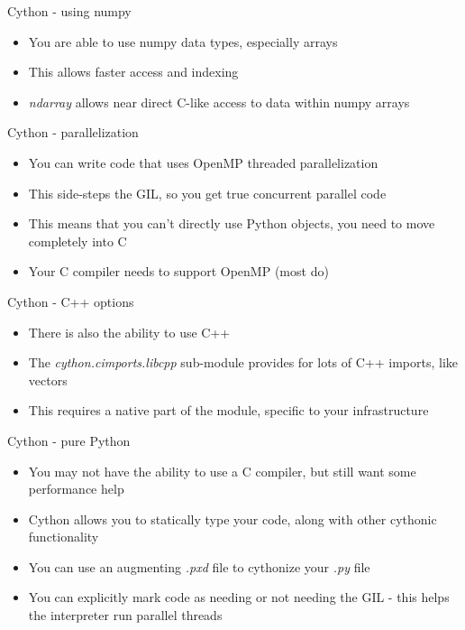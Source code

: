 \documentclass[presentation]{beamer}
\begin{document}
\begin{frame}[label=cython---using-numpy]{Cython - using numpy}
\begin{itemize}
\item You are able to use numpy data types, especially arrays
\item This allows faster access and indexing
\item \alert{\emph{ndarray}} allows near direct C-like access to data within numpy
arrays
\end{itemize}
\end{frame}
\begin{frame}[label=cython---parallelization]{Cython - parallelization}
\begin{itemize}
\item You can write code that uses OpenMP threaded parallelization
\item This side-steps the GIL, so you get true concurrent parallel code
\item This means that you can't directly use Python objects, you need to
move completely into C
\item Your C compiler needs to support OpenMP (most do)
\end{itemize}
\end{frame}
\begin{frame}[label=cython---c-options]{Cython - C++ options}
\begin{itemize}
\item There is also the ability to use C++
\item The \alert{\emph{cython.cimports.libcpp}} sub-module provides for lots of C++
imports, like vectors
\item This requires a native part of the module, specific to your
infrastructure
\end{itemize}
\end{frame}
\begin{frame}[label=cython---pure-python]{Cython - pure Python}
\begin{itemize}
\item You may not have the ability to use a C compiler, but still want some
performance help
\item Cython allows you to statically type your code, along with other
cythonic functionality
\item You can use an augmenting \alert{\emph{.pxd}} file to cythonize your \alert{\emph{.py}} file
\item You can explicitly mark code as needing or not needing the GIL - this
helps the interpreter run parallel threads
\end{itemize}
\end{frame}
\end{document}
